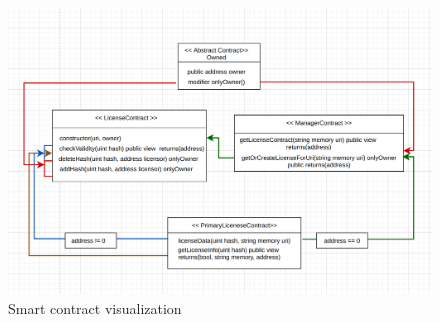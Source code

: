 \begin{center}
	
	\begin{figure}[htb!]
		
		\begin{minipage}{0.75\linewidth}
			
			\includegraphics[width=1.45\textwidth]{images/chap03_smartContract_visual.png}
		\end{minipage}
		\caption{Smart contract visualization}
		
	\end{figure}
	
\end{center}


